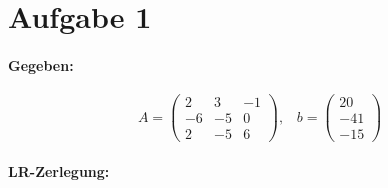 \section*{Aufgabe 1}
\paragraph{Gegeben:}

\[A = \begin{pmatrix}
     2 &  3 & -1\\
    -6 & -5 &  0\\
     2 & -5 &  6
\end{pmatrix},\;\;\; b = \begin{pmatrix}20\\-41\\-15\end{pmatrix}\]

\paragraph{LR-Zerlegung:}

